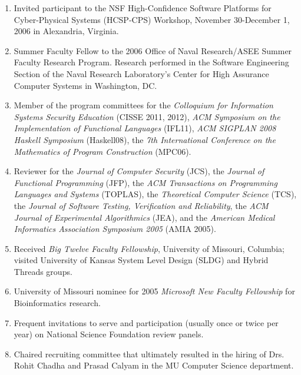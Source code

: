 \documentclass[12pt]{article} %
\begin{document}
\begin{enumerate}[leftmargin=0mm]
\item Invited participant to the NSF High-Confidence Software
  Platforms for Cyber-Physical Systems (HCSP-CPS) Workshop, November
  30-December 1, 2006 in Alexandria, Virginia.


\item Summer Faculty Fellow to the 2006 Office of Naval Research/ASEE
  Summer Faculty Research Program. Research performed in the Software
  Engineering Section of the Naval Research Laboratory's Center for
  High Assurance Computer Systems in Washington, DC. 

\item  Member of the program committees for the {\em Colloquium for Information Systems Security Education} (CISSE 2011, 2012), {\em ACM Symposium on the Implementation of Functional Languages} (IFL11), {\em ACM SIGPLAN 2008
    Haskell Symposium} (Haskell08), the {\em 7th International
Conference on the Mathematics of Program Construction} (MPC06).

\item Reviewer for the {\em Journal of Computer Security} (JCS), the {\em Journal of Functional Programming} (JFP),
the {\em ACM Transactions on Programming Languages and Systems} (TOPLAS),
the {\em Theoretical Computer Science} (TCS),
the {\em Journal of Software Testing, Verification and Reliability},
the {\em ACM Journal of Experimental Algorithmics} (JEA), and the {\em American
Medical Informatics Association Symposium 2005} (AMIA 2005). 


\item Received \emph{Big Twelve Faculty Fellowship}, University of
  Missouri, Columbia; visited University of Kansas System Level Design (SLDG)
  and Hybrid Threads groups.




\item University of Missouri nominee for 2005 {\em Microsoft New Faculty Fellowship} for Bioinformatics research.

\item Frequent invitations to serve and participation (usually once or twice per year)  on National Science Foundation review panels.


\item Chaired recruiting committee that ultimately resulted in the hiring of Drs. Rohit Chadha and Prasad Calyam in the MU Computer Science department. 


\end{enumerate}
\end{document}
